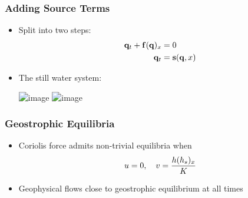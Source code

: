 \documentclass[handout]{beamer}
\begin{document}
\begin{frame}[t]
  \frametitle{Adding Source Terms}
  \begin{itemize}
    \item Split into two steps:
    \begin{align}
      \vb q_t + \vb f(\vb q)_x &= 0 \\
      \vb q_t &= \vb s(\vb q, x)
    \end{align}
    \item<2-> The still water system:\\
    \begin{center}
      \includegraphics<2| handout:0>[width=0.65\textwidth]{img/bathymetry1}
      \includegraphics<3>[width=0.65\textwidth]{img/bathymetry2}
    \end{center}
  \end{itemize}
\end{frame}

\begin{frame}
  \frametitle{Geostrophic Equilibria}
  \begin{itemize}
    \item Coriolis force admits non-trivial equilibria when
    \begin{equation}
      u = 0\qc v = \frac{h (h_s)_x}{K}
    \end{equation}
    \begin{center}
    \end{center}
    \vspace{0.5cm}
    \item Geophysical flows close to geostrophic equilibrium at all times
  \end{itemize}
\end{frame}
\end{document}
